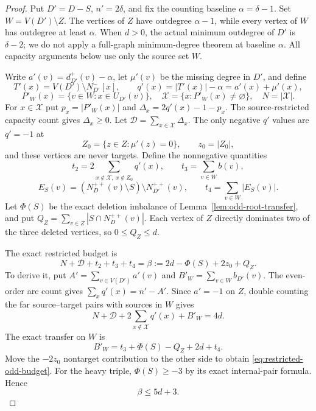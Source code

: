 \begin{proof}
Put $D'=D-S$, $n'=2\delta$, and fix the counting baseline
$\alpha=\delta-1$.  Set $W=V(D')\setminus Z$.
The vertices of $Z$ have outdegree $\alpha-1$, while every vertex
of $W$ has outdegree at least $\alpha$.
When $d>0$, the actual minimum outdegree of $D'$ is $\delta-2$;
we do not apply a full-graph minimum-degree theorem at baseline
$\alpha$.  All capacity arguments below use only the source set $W$.

Write $a'(v)=d_{D'}^+(v)-\alpha$, let $\mu'(v)$ be the missing
degree in $D'$, and define
\[
 T'(x)=V(D')\setminus N^-_{D'}[x],\qquad
 q'(x)=|T'(x)|-\alpha=a'(x)+\mu'(x),
\]
\[
 P'_W(x)=\{v\in W:x\in U_{D'}(v)\},\quad
 \mathcal X=\{x:P'_W(x)\ne\varnothing\},\quad N=|\mathcal X|.
\]
For $x\in\mathcal X$ put
$p_x=|P'_W(x)|$ and $\Delta_x=2q'(x)-1-p_x$.
The source-restricted capacity count gives $\Delta_x\ge0$.
Let $\mathcal D=\sum_{x\in\mathcal X}\Delta_x$.
The only negative $q'$ values are $q'=-1$ at
\[
 Z_0=\{z\in Z:\mu'(z)=0\},\qquad z_0=|Z_0|,
\]
and these vertices are never targets.
Define the nonnegative quantities
\[
 t_2=2\!\sum_{x\notin\mathcal X,\ x\notin Z_0}\!q'(x),
 \qquad t_3=\sum_{v\in W}b(v),
\]
\[
 E_S(v)=(N_D^{++}(v)\setminus S)\setminus N_{D'}^{++}(v),
 \qquad t_4=\sum_{v\in W}|E_S(v)|.
\]
Let $\Phi(S)$ be the exact deletion imbalance of
Lemma~\ref{lem:odd-root-transfer}, and put
$Q_Z=\sum_{v\in Z}|S\cap N_D^{++}(v)|$.
Each vertex of $Z$ directly dominates two of the three deleted
vertices, so $0\le Q_Z\le d$.

The exact restricted budget is
\begin{equation}\label{eq:restricted-odd-budget}
 {N+\mathcal D+t_2+t_3+t_4
                =\beta:=2d-\Phi(S)+2z_0+Q_Z.}
\end{equation}
To derive it, put $A'=\sum_{v\in V(D')}a'(v)$ and
$B'_W=\sum_{v\in W}b_{D'}(v)$.
The even-order arc count gives $\sum_xq'(x)=n'-A'$.
Since $a'=-1$ on $Z$, double counting the far source--target pairs
with sources in $W$ gives
\[
 N+\mathcal D+2\sum_{x\notin\mathcal X}q'(x)+B'_W=4d.
\]
The exact transfer on $W$ is
\[
 B'_W=t_3+\Phi(S)-Q_Z+2d+t_4.
\]
Move the $-2z_0$ nontarget contribution to the other side to obtain
\eqref{eq:restricted-odd-budget}.
For the heavy triple, $\Phi(S)\ge-3$ by its exact internal-pair
formula.  Hence
\begin{equation}\label{eq:restricted-odd-beta-coarse}
 \beta\le5d+3.
\end{equation}


\end{proof}
